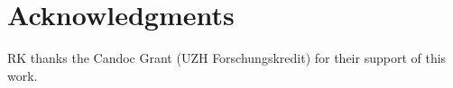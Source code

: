 \documentclass{ws-procs975x65}
\begin{document}
\section*{Acknowledgments}
RK thanks the Candoc Grant (UZH Forschungskredit) for their support of this work.






% 
% 
% 
% 
% 
% 
% 
% 
\end{document}
